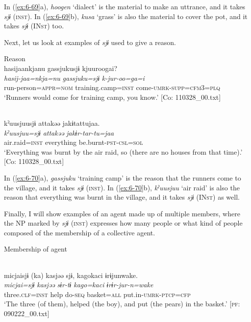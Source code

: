 In (\ref{ex:6-69}a), \textit{hoogen} ‘dialect’ is the material to make an uttrance, and it takes \textit{sjɨ} (\textsc{inst}). In (\ref{ex:6-69}b), \textit{kusa} ‘grass’ is also the material to cover the pot, and it takes \textit{sjɨ} (IN\textsc{st}) too.

Next, let us look at examples of \textit{sjɨ} used to give a reason.

\ea\label{ex:6-70}
  Reason
 \ea{}\\
{\TM}
\glll  hasijaankjanu  {\textbar}gassjuku{\textbar}sjɨ  kjuuroogai?\\
\textit{hasij-jaa=nkja=nu}  \textit{gassjuku=sjɨ}  \textit{k-jur-oo=ga=i}\\
run-person=\textsc{appr}=\textsc{nom}  training.camp=\textsc{inst}  come-\textsc{umrk}-\textsc{supp}=\textsc{cfm}3=\textsc{plq}\\
\glt ‘Runners would come for training camp, you know.’ [Co: 110328\_00.txt]
\z

\ex{}\\
{\TM}
\glll  kˀuusjuusjɨ  attakəə  jakɨtattujaa.\\
\textit{kˀuusjuu=sjɨ}  \textit{attakəə}  \textit{jakɨr-tar-tu=jaa}\\
air.raid=\textsc{inst}  everything  be.burnt-\textsc{pst}-\textsc{csl}=\textsc{sol}\\
\glt ‘Everything was burnt by the air raid, so (there are no houses from that time).’ [Co: 110328\_00.txt]
\z

In (\ref{ex:6-70}a), \textit{gassjuku} ‘training camp’ is the reason that the runners come to the village, and it takes \textit{sjɨ} (\textsc{inst}). In (\ref{ex:6-70}b), \textit{kˀuusjuu} ‘air raid’ is also the reason that everything was burnt in the village, and it takes \textit{sjɨ} (IN\textsc{st}) as well.

Finally, I will show examples of an agent made up of multiple members, where the NP marked by \textit{sjɨ} (\textsc{inst}) expresses how many people or what kind of people composed of the membership of a collective agent.

\ea\label{ex:6-71}
  Membership of agent

 \ea{}\\
{\TM}
\glll  micjaisjɨ  (ka)  kasjəə  sjɨ,  kagokaci   ɨrɨjunwake.\\
\textit{micjai=sjɨ}    \textit{kasjəə}  \textit{sɨr-tɨ}  \textit{kago=kaci}   \textit{ɨrɨr-jur-n=wake}\\
three.\textsc{clf}=\textsc{inst}    help  do-\textsc{seq}  basket=\textsc{all}  put.in-\textsc{umrk}-\textsc{ptcp}=\textsc{cfp}\\
\glt ‘The three (of them), helped (the boy), and put (the pears) in the basket.’ [\textsc{pf}: 090222\_00.txt]
\z

